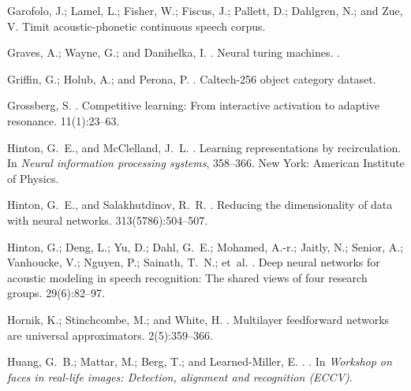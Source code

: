 \documentclass[letterpaper]{article}
\begin{document}
\begin{thebibliography}{}
Garofolo, J.; Lamel, L.; Fisher, W.; Fiscus, J.; Pallett, D.; Dahlgren, N.; and
  Zue, V.
\newblock Timit acoustic-phonetic continuous speech corpus.

Graves, A.; Wayne, G.; and Danihelka, I.
.
\newblock Neural turing machines.
.

Griffin, G.; Holub, A.; and Perona, P.
.
\newblock Caltech-256 object category dataset.

Grossberg, S.
.
\newblock Competitive learning: From interactive activation to adaptive
  resonance.
 11(1):23--63.

Hinton, G.~E., and McClelland, J.~L.
.
\newblock Learning representations by recirculation.
\newblock In {\em Neural information processing systems},  358--366.
\newblock New York: American Institute of Physics.

Hinton, G.~E., and Salakhutdinov, R.~R.
.
\newblock Reducing the dimensionality of data with neural networks.
 313(5786):504--507.

Hinton, G.; Deng, L.; Yu, D.; Dahl, G.~E.; Mohamed, A.-r.; Jaitly, N.; Senior,
  A.; Vanhoucke, V.; Nguyen, P.; Sainath, T.~N.; et~al.
.
\newblock Deep neural networks for acoustic modeling in speech recognition: The
  shared views of four research groups.
 29(6):82--97.

Hornik, K.; Stinchcombe, M.; and White, H.
.
\newblock Multilayer feedforward networks are universal approximators.
 2(5):359--366.

Huang, G.~B.; Mattar, M.; Berg, T.; and Learned-Miller, E.
.
.
\newblock In {\em Workshop on faces in real-life images: Detection, alignment
  and recognition (ECCV)}.


\end{thebibliography}
\end{document}
